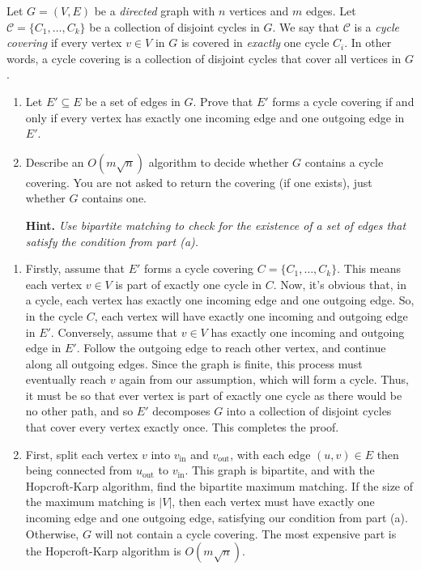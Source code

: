 \documentclass{article}
\begin{document}
\begin{question}
Let $G = (V, E)$ be a {\em directed} graph with $n$ vertices and $m$ edges. Let $\mathscr C = \{C_1, \dots, C_k\}$ be a collection of disjoint cycles in $G$. We say that $\mathscr C$ is a {\em cycle covering} if every vertex $v \in V$ in $G$ is covered in {\em exactly} one cycle $C_i$. In other words, a cycle covering is a collection of disjoint cycles that cover all vertices in $G$.

\begin{enumerate}[label = (\alph*)]
    \item Let $E' \subseteq E$ be a set of edges in $G$. Prove that $E'$ forms a cycle covering if and only if every vertex has exactly one incoming edge and one outgoing edge in $E'$.

    \item Describe an $O(m\sqrt n)$ algorithm to decide whether $G$ contains a cycle covering. You are not asked to return the covering (if one exists), just whether $G$ contains one.

    {\bfseries Hint.} {\em Use bipartite matching to check for the existence of a set of edges that satisfy the condition from part (a).}
\end{enumerate}
\end{question}

\begin{solution}
\begin{enumerate}[label = (\alph*)]
    \item Firstly, assume that $E'$ forms a cycle covering $C = \{ C_1, \dots, C_k\}$. This means each vertex $v \in V$ is part of exactly one cycle in $C$. Now, it's obvious that, in a cycle, each vertex has exactly one incoming edge and one outgoing edge. So, in the cycle $C$, each vertex will have exactly one incoming and outgoing edge in $E'$. Conversely, assume that $v \in V$ has exactly one incoming and outgoing edge in $E'$. Follow the outgoing edge to reach other vertex, and continue along all outgoing edges. Since the graph is finite, this process must eventually reach $v$ again from our assumption, which will form a cycle. Thus, it must be so that ever vertex is part of exactly one cycle as there would be no other path, and so $E'$ decomposes $G$ into a collection of disjoint cycles that cover every vertex exactly once. This completes the proof.

    \item First, split each vertex $v$ into $v_\text{in}$ and $v_\text{out}$, with each edge $(u, v) \in E$ then being connected from $u_\text{out}$ to $v_\text{in}$. This graph is bipartite, and with the Hopcroft-Karp algorithm, find the bipartite maximum matching. If the size of the maximum matching is $|V|$, then each vertex must have exactly one incoming edge and one outgoing edge, satisfying our condition from part (a). Otherwise, $G$ will not contain a cycle covering. The most expensive part is the Hopcroft-Karp algorithm is $O(m\sqrt{n})$.
\end{enumerate}
\end{solution}
\end{document}
